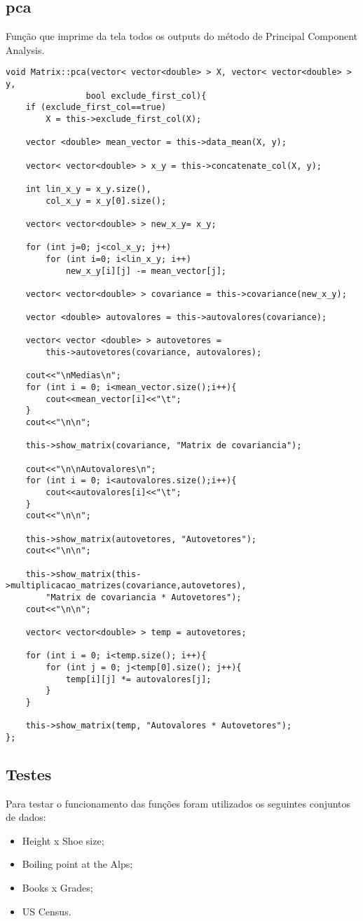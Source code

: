 \documentclass[a4paper, 11pt]{article}
\begin{document}
\subsection*{pca}
Função que imprime da tela todos os outputs do método de Principal Component Analysis.

\begin{lstlisting}
void Matrix::pca(vector< vector<double> > X, vector< vector<double> > y, 
				bool exclude_first_col){
	if (exclude_first_col==true)
		X = this->exclude_first_col(X);
		
	vector <double> mean_vector = this->data_mean(X, y);

	vector< vector<double> > x_y = this->concatenate_col(X, y);

	int lin_x_y = x_y.size(),
		col_x_y = x_y[0].size();

	vector< vector<double> > new_x_y= x_y;
	
	for (int j=0; j<col_x_y; j++)
		for (int i=0; i<lin_x_y; i++)
			new_x_y[i][j] -= mean_vector[j];

	vector< vector<double> > covariance = this->covariance(new_x_y);
	
	vector <double> autovalores = this->autovalores(covariance);
	
    vector< vector <double> > autovetores = 
    	this->autovetores(covariance, autovalores);

	cout<<"\nMedias\n";
	for (int i = 0; i<mean_vector.size();i++){
		cout<<mean_vector[i]<<"\t";
	}
	cout<<"\n\n";

	this->show_matrix(covariance, "Matrix de covariancia");
	
	cout<<"\n\nAutovalores\n";
	for (int i = 0; i<autovalores.size();i++){
		cout<<autovalores[i]<<"\t";
	}
	cout<<"\n\n";
	
	this->show_matrix(autovetores, "Autovetores");
	cout<<"\n\n";

	this->show_matrix(this->multiplicacao_matrizes(covariance,autovetores), 
    	"Matrix de covariancia * Autovetores");
	cout<<"\n\n";

	vector< vector<double> > temp = autovetores;
	
	for (int i = 0; i<temp.size(); i++){
		for (int j = 0; j<temp[0].size(); j++){
			temp[i][j] *= autovalores[j];
		}
	}
	
	this->show_matrix(temp, "Autovalores * Autovetores");
};
\end{lstlisting}



\subsection*{Testes}
Para testar o funcionamento das funções foram utilizados os seguintes conjuntos de dados:
\begin{itemize}
\item Height x Shoe size;
\item Boiling point at the Alps;
\item Books x Grades;
\item US Census.
\end{itemize}
\end{document}

